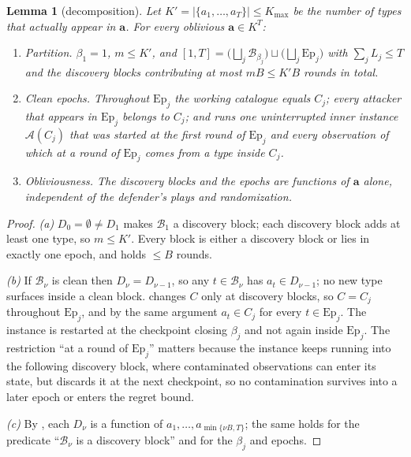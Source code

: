 \documentclass[letterpaper,9pt,twocolumn]{extarticle}
\newcommand{\avec}{\mathbf{a}}
\newcommand{\Kmax}{K_{\max}}
\newcommand{\cB}{\mathcal{B}}
\newcommand{\Ep}{\mathrm{Ep}}
\theoremstyle{plain}
\newtheorem{lemma}[theorem]{Lemma}
\theoremstyle{definition}
\theoremstyle{remark}
\begin{document}
\begin{lemma}[decomposition]
\label{lem:blocks}
Let $K'=|\{a_1,\dots,a_T\}|\le\Kmax$ be the number of types that actually
appear in $\avec$. For every oblivious $\avec\in K^T$:
\begin{enumerate}[leftmargin=1.4em,itemsep=0.1em,topsep=0.2em,label=(\alph*)]
  \item \emph{Partition.} $\beta_1=1$, $m\le K'$, and
  $[1,T]=\bigl(\bigsqcup_{j}\cB_{\beta_j}\bigr)\sqcup\bigl(\bigsqcup_{j}\Ep_j\bigr)$
  with $\sum_j L_j\le T$ and the discovery blocks contributing at most
  $mB\le K'B$ rounds in total.
  \item \emph{Clean epochs.} Throughout $\Ep_j$ the working catalogue
  equals $C_j$; every attacker that appears in $\Ep_j$ belongs to $C_j$;
  and  runs one uninterrupted inner instance
  $\mathcal{A}(C_j)$ that was started at the first round of $\Ep_j$ and
  every observation of which \emph{at a round of $\Ep_j$} comes from a
  type inside $C_j$.
  \item \emph{Obliviousness.} The discovery blocks and the epochs are
  functions of $\avec$ alone, independent of the defender's plays and
  randomization.
\end{enumerate}
\end{lemma}

\begin{proof}
\emph{(a)} $D_0=\emptyset\ne D_1$ makes $\cB_1$ a discovery block; each
discovery block adds at least one type, so $m\le K'$. Every block is
either a discovery block or lies in exactly one epoch, and holds $\le B$
rounds.

\emph{(b)} If $\cB_\nu$ is clean then $D_\nu=D_{\nu-1}$, so any
$t\in\cB_\nu$ has $a_t\in D_{\nu-1}$; no new type surfaces inside a clean
block.  changes $C$ only at discovery blocks, so $C=C_j$
throughout $\Ep_j$, and by the same argument $a_t\in C_j$ for every
$t\in\Ep_j$. The instance is restarted at the checkpoint closing
$\beta_j$ and not again inside $\Ep_j$. The restriction ``at a round of
$\Ep_j$'' matters because the instance keeps running into the following
discovery block, where contaminated observations can enter its state,
but  discards it at the next checkpoint, so no
contamination survives into a later epoch or enters the regret bound.

\emph{(c)} By , each $D_\nu$ is a function of
$a_1,\dots,a_{\min\{\nu B,T\}}$; the same holds for the predicate
``$\cB_\nu$ is a discovery block'' and for the $\beta_j$ and epochs.
\end{proof}
\end{document}
